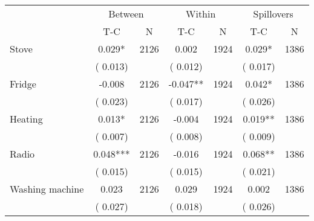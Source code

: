 
\begin{tabular}{l*{6}{c}}\hline&\multicolumn{2}{c}{Between}&\multicolumn{2}{c}{Within}&\multicolumn{2}{c}{Spillovers} \\ \cmidrule(r){2-3}\cmidrule(l){4-5}\cmidrule(l){6-7} & {T-C} & {N} & {T-C} & {N}  & {T-C}  & {N}  \\ \midrule
Stove        &              0.029*      &       2126       &              0.002      &       1924       &              0.029*      &       1386       \\
                       &       (       0.013)            &                               &       (       0.012)            &                               &       (       0.017)            &                               \\
Fridge        &             -0.008      &       2126       &             -0.047**      &       1924       &              0.042*      &       1386       \\
                       &       (       0.023)            &                               &       (       0.017)            &                               &       (       0.026)            &                               \\
Heating        &              0.013*      &       2126       &             -0.004      &       1924       &              0.019**      &       1386       \\
                       &       (       0.007)            &                               &       (       0.008)            &                               &       (       0.009)            &                               \\
Radio        &              0.048***      &       2126       &             -0.016      &       1924       &              0.068**      &       1386       \\
                       &       (       0.015)            &                               &       (       0.015)            &                               &       (       0.021)            &                               \\
Washing machine        &              0.023      &       2126       &              0.029      &       1924       &              0.002      &       1386       \\
                       &       (       0.027)            &                               &       (       0.018)            &                               &       (       0.026)            &                               \\

\end{tabular}
